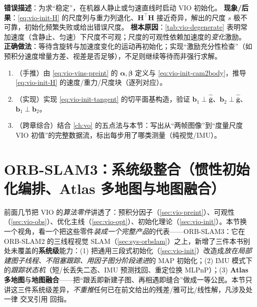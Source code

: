 \begin{pitfall}
\textbf{错误描述}：为求“稳定”，在机器人静止或匀速直线时启动 VIO 初始化。
\textbf{现象/后果}：\cref{eq:vio-init-H} 的尺度列与重力列退化、$\mathbf{H}^\top\mathbf{H}$ 接近奇异，解出的尺度 $s$ 极不可靠，初始化频繁失败或给出错误尺度。
\textbf{根本原因}：\cref{tab:vio-degenerate} 表明常加速度（含静止、匀速）下尺度不可观；尺度的可观性依赖加速度的\emph{变化}激励。
\textbf{正确做法}：等待含旋转与加速度变化的运动再初始化；实现“激励充分性检查”（如预积分速度增量方差、视差是否足够），不足则继续等待而非强行求解。
\end{pitfall}

\begin{practice}
\begin{enumerate}
  \item （手推）由 \cref{eq:vio-vins-preint} 的 $\boldsymbol{\alpha},\boldsymbol{\beta}$ 定义与 \cref{eq:vio-init-cam2body}，推导 \cref{eq:vio-init-H} 的速度/重力/尺度块（逐列对应）。
  \item （实现）实现 \cref{eq:vio-init-tangent} 的切平面基构造，验证 $\mathbf{b}_1\perp\hat{\bar{\mathbf{g}}}$、$\mathbf{b}_2\perp\hat{\bar{\mathbf{g}}}$、$\mathbf{b}_1\perp\mathbf{b}_2$。
  \item （跨章综合）结合 \cref{ch:vo} 的五点法与本节：写出从“两帧图像”到“度量尺度 VIO 初值”的完整数据流，标出每步用了哪类测量（纯视觉/IMU）。
\end{enumerate}
\end{practice}

\section{ORB-SLAM3：系统级整合（惯性初始化编排、Atlas 多地图与地图融合）}
\label{sec:vio-orbslam3}

前面几节把 VIO 的\emph{算法零件}讲透了：预积分因子（\cref{sec:vio-preint}）、可观性（\cref{sec:vio-obs}）、优化主线（\cref{sec:vio-opt}）、初始化理论（\cref{sec:vio-init}）。本节换一个视角，看一个把这些零件\emph{装成一个完整产品}的代表——ORB-SLAM3\cite{campos2021orbslam3}：它在 ORB-SLAM2 的三线程视觉 SLAM（\cref{sec:sys-orbslam}）之上，新增了三件本书别处未覆盖的\textbf{系统级}能力：(1) 把通用三段式初始化（\cref{sec:vio-init}）改造成\emph{放在局部建图子线程、不阻塞跟踪、用因子图分阶段递进}的 MAP 初始化；(2) IMU 模式下的\emph{跟踪状态机}（短/长丢失二态、IMU 预测找回、重定位换 MLPnP）；(3) \textbf{Atlas 多地图}与\textbf{地图融合}——把“跟丢即新建子图、再相遇即缝合”做成一等公民。本节只讲这三件系统级差异，\emph{不重推}任何已在前文给出的残差/雅可比/线性解，凡涉及处一律 交叉引用 回指。

